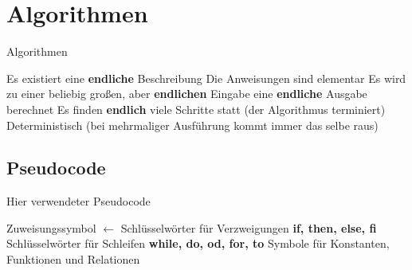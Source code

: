 \documentclass[handout]{beamer}
\begin{document}

\begin{frame}
	\titlepage
\end{frame}

\section{Algorithmen}
\begin{frame}{Algorithmen}
	\begin{itemize}
		\pitem Es existiert eine \textbf{endliche} Beschreibung
		\pitem Die Anweisungen sind elementar
		\pitem Es wird zu einer beliebig großen, aber \textbf{endlichen} Eingabe eine \textbf{endliche} Ausgabe berechnet
		\pitem Es finden \textbf{endlich} viele Schritte statt (der Algorithmus terminiert)
		\pitem Deterministisch (bei mehrmaliger Ausführung kommt immer das selbe raus)
	\end{itemize}
\end{frame}

\subsection{Pseudocode}
\begin{frame}{Hier verwendeter Pseudocode}
	\begin{itemize}
		\pitem Zuweisungssymbol $\leftarrow$
		\pitem Schlüsselwörter für Verzweigungen \textbf{if, then, else, fi}
		\pitem Schlüsselwörter für Schleifen \textbf{while, do, od, for, to}
		\pitem Symbole für Konstanten, Funktionen und Relationen
	\end{itemize}
\end{frame}
\end{document}
